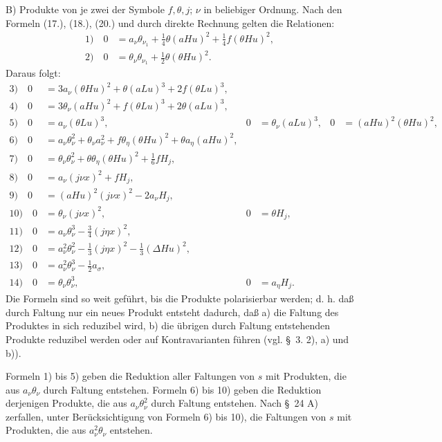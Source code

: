 \documentclass[11pt]{article}
\newcommand{\D}{\Delta}
\begin{document}
B) Produkte von je zwei der Symbole $f,\theta,j$; $\nu$ in beliebiger Ordnung. Nach den Formeln (17.), (18.), (20.) und durch direkte Rechnung gelten die Relationen:
\begin{align*}
1)\quad 0&=a_\nu\theta_{\nu_1}+\frac14\theta(aHu)^2+\frac14f(\theta Hu)^2,\\
2)\quad 0&=\theta_\nu\theta_{\nu_1}+\frac12\theta(\theta Hu)^2.
\end{align*}
Daraus folgt:
\begin{align*}
3)\quad 0&=3a_\nu(\theta Hu)^2+\theta(aLu)^3+2f(\theta Lu)^3,\\
4)\quad 0&=3\theta_\nu(aHu)^2+f(\theta Lu)^3+2\theta(aLu)^3,\\
5)\quad 0&=a_\nu(\theta Lu)^3,
&0&=\theta_\nu(aLu)^3,
&0&=(aHu)^2(\theta Hu)^2,\\
6)\quad 0&=a_\nu\theta_\nu^2+\theta_\nu a_\nu^2+f\theta_\eta(\theta Hu)^2+\theta a_\eta(aHu)^2,\\
7)\quad 0&=\theta_\nu\theta_\nu^2+\theta\theta_\eta(\theta Hu)^2+\frac16fH_j,\\
8)\quad 0&=a_\nu(j\nu x)^2+fH_j,\\
9)\quad 0&=(aHu)^2(j\nu x)^2-2a_\nu H_j,\\
10)\quad 0&=\theta_\nu(j\nu x)^2,
&0&=\theta H_j,\\
11)\quad 0&=a_\nu\theta_\nu^3-\frac34(j\eta x)^2,\\
12)\quad 0&=a_\nu^2\theta_\nu^2-\frac13(j\eta x)^2-\frac13(\D Hu)^2,\\
13)\quad 0&=a_\nu^2\theta_\nu^3-\frac12a_\sigma,\\
14)\quad 0&=\theta_\nu\theta_\nu^3,
&0&=a_\eta H_j.
\end{align*}
Die Formeln sind so weit geführt, bis die Produkte polarisierbar werden; d. h. daß durch Faltung nur ein neues Produkt entsteht dadurch, daß a) die Faltung des Produktes in sich reduzibel wird, b) die übrigen durch Faltung entstehenden Produkte reduzibel werden oder auf Kontravarianten führen (vgl. \S\ 3. 2), a) und b)).

Formeln 1) bis 5) geben die Reduktion aller Faltungen von $s$ mit Produkten, die aus $a_\nu\theta_\nu$ durch Faltung entstehen. Formeln 6) bis 10) geben die Reduktion derjenigen Produkte, die aus $a_\nu\theta_\nu^2$ durch Faltung entstehen. Nach \S\ 24 A) zerfallen, unter Berücksichtigung von Formeln 6) bis 10), die Faltungen von $s$ mit Produkten, die aus $a_\nu^2\theta_\nu$ entstehen.
\end{document}
